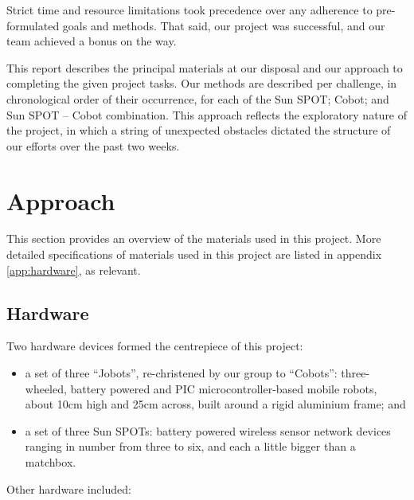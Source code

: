 \documentclass[a4paper,10pt]{article} %
\begin{document}
Strict time and resource limitations took precedence over any adherence
to pre-formulated goals and methods. That said, our project was successful,
and our team achieved a bonus on the way.

This report describes the principal materials at our disposal and our approach
to completing the given project tasks. Our methods are described per challenge,
in chronological order of their occurrence, for each of the Sun SPOT; Cobot; and
Sun SPOT -- Cobot combination. This approach reflects the exploratory nature of
the project, in which a string of unexpected obstacles dictated the structure of
our efforts over the past two weeks.


%
%
%

\pagebreak

\section{Approach} %

This section provides an overview of the materials used in this project. More
detailed specifications of materials used in this project are listed in appendix
\ref{app:hardware}, as relevant.

\subsection{Hardware} %

Two hardware devices formed the centrepiece of this project:

\begin{itemize}
    \item a set of three ``Jobots'', re-christened by our group to
    ``Cobots'': three-wheeled, battery powered and PIC microcontroller-based mobile
    robots, about 10cm high and 25cm across, built around a rigid aluminium frame;
    and
    \item a set of three Sun SPOTs: battery powered wireless sensor network
    devices ranging in number from three to six, and each a little bigger than a
    matchbox.
\end{itemize}

Other hardware included:
\end{document}
